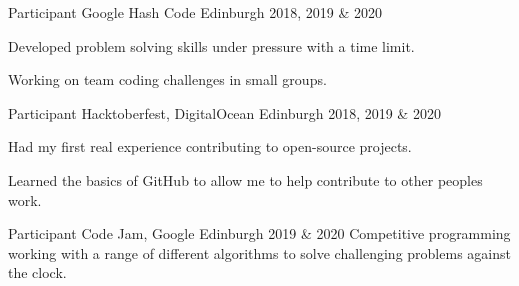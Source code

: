 \begin{cventries}
  \cventry
    {Participant} %
    {Google Hash Code} %
    {Edinburgh} %
    {2018, 2019 \& 2020} %
    {
      \begin{cvitems} %
        \item {Developed problem solving skills under pressure with a time limit.}
        \item {Working on team coding challenges in small groups.}
      \end{cvitems}
    }


  \cventry
    {Participant} %
    {Hacktoberfest, DigitalOcean} %
    {Edinburgh} %
    {2018, 2019 \& 2020} %
    {
      \begin{cvitems} %
        \item {Had my first real experience contributing to open-source projects.}
        \item {Learned the basics of GitHub to allow me to help contribute to other peoples work.}
      \end{cvitems}
    }
    

  \cventry
     {Participant}
     {Code Jam, Google}
     {Edinburgh}
     {2019 \& 2020}
     {
      Competitive programming working with a range of different algorithms to solve challenging problems against the clock.
     }



\end{cventries}